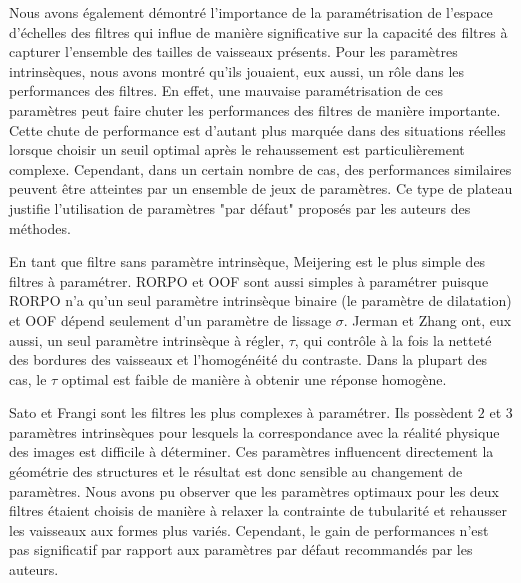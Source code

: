 Nous avons également démontré l'importance de la paramétrisation de l'espace d'échelles des filtres qui influe de manière significative sur la capacité des filtres à capturer l'ensemble des tailles de vaisseaux présents. Pour les paramètres intrinsèques, nous avons montré qu'ils jouaient, eux aussi, un rôle dans les performances des filtres. En effet, une mauvaise paramétrisation de ces paramètres peut faire chuter les performances des filtres de manière importante. Cette chute de performance est d'autant plus marquée dans des situations réelles lorsque choisir un seuil optimal après le rehaussement est particulièrement complexe. Cependant, dans un certain nombre de cas, des performances similaires peuvent être atteintes par un ensemble de jeux de paramètres. Ce type de plateau justifie l'utilisation de paramètres "par défaut" proposés par les auteurs des méthodes.   

En tant que filtre sans paramètre intrinsèque, Meijering est le plus simple des filtres à paramétrer. RORPO et OOF sont aussi simples à paramétrer puisque RORPO n'a qu'un seul paramètre intrinsèque binaire (le paramètre de dilatation) et OOF dépend seulement d'un paramètre de lissage $\sigma$. Jerman et Zhang ont, eux aussi, un seul paramètre intrinsèque à régler, $\tau$, qui contrôle à la fois la netteté des bordures des vaisseaux et l'homogénéité du contraste. Dans la plupart des cas, le $\tau$ optimal est faible de manière à obtenir une réponse homogène. 

Sato et Frangi sont les filtres les plus complexes à paramétrer. Ils possèdent $2$ et $3$ paramètres intrinsèques pour lesquels la correspondance avec la réalité physique des images est difficile à déterminer. Ces paramètres influencent directement la géométrie des structures et le résultat est donc sensible au changement de paramètres. Nous avons pu observer que les paramètres optimaux pour les deux filtres étaient choisis de manière à relaxer la contrainte de tubularité et rehausser les vaisseaux aux formes plus variés. Cependant, le gain de performances n'est pas significatif par rapport aux paramètres par défaut recommandés par les auteurs.


